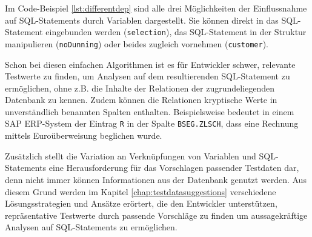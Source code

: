 Im Code-Beispiel \ref{lst:differentdep} sind alle drei Möglichkeiten der Einflussnahme auf SQL-Statements durch Variablen dargestellt.
Sie können direkt in das SQL-Statement eingebunden werden (\texttt{selection}), das SQL-Statement in der Struktur manipulieren (\texttt{noDunning}) oder beides zugleich vornehmen (\texttt{customer}).

Schon bei diesen einfachen Algorithmen ist es für Entwickler schwer, relevante Testwerte zu finden, um Analysen auf dem resultierenden SQL-Statement zu ermöglichen, ohne z.B. die Inhalte der Relationen der zugrundeliegenden Datenbank zu kennen.
Zudem können die Relationen kryptische Werte in unverständlich benannten Spalten enthalten.
Beispielsweise bedeutet in einem SAP ERP-System der Eintrag \texttt{R} in der Spalte \texttt{BSEG.ZLSCH}, dass eine Rechnung mittels Euroüberweisung beglichen wurde.

Zusätzlich stellt die Variation an Verknüpfungen von Variablen und SQL-Statements eine Herausforderung für das Vorschlagen passender Testdaten dar, denn nicht immer können Informationen aus der Datenbank genutzt werden.
Aus diesem Grund werden im Kapitel \ref{chap:testdatasuggestions} verschiedene Lösungsstrategien und Ansätze erörtert, die den Entwickler unterstützen, repräsentative Testwerte durch passende Vorschläge zu finden um aussagekräftige Analysen auf SQL-Statements zu ermöglichen.
